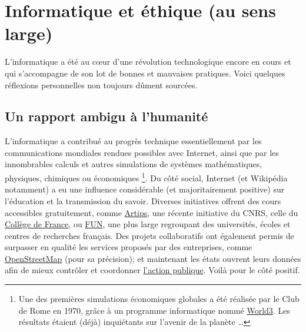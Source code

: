 \documentclass[10pt]{article}
\begin{document}
\section{Informatique et éthique (au sens large)}

L'informatique a été au cœur d'une révolution technologique encore en cours
et qui s'accompagne de son lot de bonnes et mauvaises pratiques.
Voici quelques réflexions personnelles non toujours dûment sourcées.


\subsection{Un rapport ambigu à l'humanité}

L'informatique a contribué au progrès technique essentiellement par les communications mondiales rendues possibles
avec Internet, ainsi que par les innombrables calculs et autres simulations de systèmes mathématiques, physiques, chimiques ou économiques \footnote{
  Une des premières simulations économiques globales a été réalisée par le Club de Rome en 1970, grâce à un programme informatique nommé
  \href{https://fr.wikipedia.org/wiki/World3}{World3}. Les résultats étaient (déjà) inquiétants sur l'avenir de la planète \ldots
}.
Du côté social, Internet (et Wikipédia notamment) a eu une influence considérable (et majoritairement positive) sur l'éducation
et la transmission du savoir. Diverses initiatives offrent des cours accessibles gratuitement, comme 
\href{https://cnrs.artips.fr/course}{Artips}, une récente initiative du CNRS,
celle du \href{https://www.college-de-france.fr/site/college/index.htm}{Collège de France}, ou 
\href{https://www.fun-mooc.fr/}{FUN}, une plus large regroupant des universités, écoles et centres de recherches français.
Des projets collaboratifs ont également permis de surpasser en qualité les services proposés par des entreprises,
comme \href{https://www.openstreetmap.org/}{OpenStreetMap} (pour sa précision);
et maintenant les états ouvrent leurs données afin de mieux contrôler et coordonner \href{https://www.data.gouv.fr/}{l'action publique}.
Voilà pour le côté positif.
\end{document}

